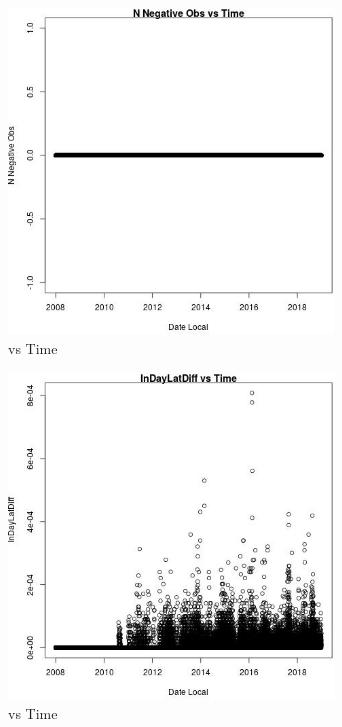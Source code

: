 \begin{figure} 
\centering  
\includegraphics[width=0.77\textwidth]{Code_Outputs/Report_PM25_Step4_part_e_de_duplicated_aves_prioritize_24hr_obs_ML_input_N_Negative_ObsvDate_Local.jpg} 
\caption{\label{fig:Report_PM25_Step4_part_e_de_duplicated_aves_prioritize_24hr_obs_ML_inputN_Negative_ObsvDate_Local}vs Time} 
\end{figure} 
 

\clearpage 

\begin{figure} 
\centering  
\includegraphics[width=0.77\textwidth]{Code_Outputs/Report_PM25_Step4_part_e_de_duplicated_aves_prioritize_24hr_obs_ML_input_InDayLatDiffvDate_Local.jpg} 
\caption{\label{fig:Report_PM25_Step4_part_e_de_duplicated_aves_prioritize_24hr_obs_ML_inputInDayLatDiffvDate_Local}vs Time} 
\end{figure} 
 

